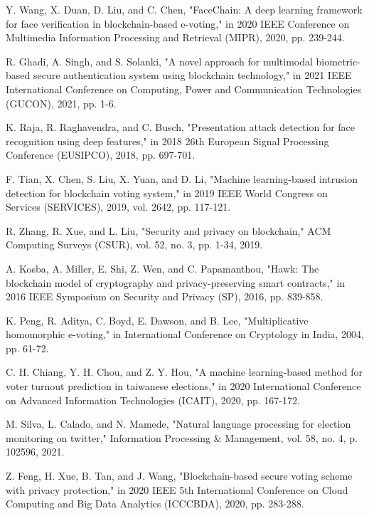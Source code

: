 \documentclass[conference]{IEEEtran}
\begin{document}
\begin{thebibliography}{10}
 Y. Wang, X. Duan, D. Liu, and C. Chen, "FaceChain: A deep learning framework for face verification in blockchain-based e-voting," in 2020 IEEE Conference on Multimedia Information Processing and Retrieval (MIPR), 2020, pp. 239-244.

 R. Ghadi, A. Singh, and S. Solanki, "A novel approach for multimodal biometric-based secure authentication system using blockchain technology," in 2021 IEEE International Conference on Computing, Power and Communication Technologies (GUCON), 2021, pp. 1-6.

 K. Raja, R. Raghavendra, and C. Busch, "Presentation attack detection for face recognition using deep features," in 2018 26th European Signal Processing Conference (EUSIPCO), 2018, pp. 697-701.

 F. Tian, X. Chen, S. Liu, X. Yuan, and D. Li, "Machine learning-based intrusion detection for blockchain voting system," in 2019 IEEE World Congress on Services (SERVICES), 2019, vol. 2642, pp. 117-121.

 R. Zhang, R. Xue, and L. Liu, "Security and privacy on blockchain," ACM Computing Surveys (CSUR), vol. 52, no. 3, pp. 1-34, 2019.

 A. Kosba, A. Miller, E. Shi, Z. Wen, and C. Papamanthou, "Hawk: The blockchain model of cryptography and privacy-preserving smart contracts," in 2016 IEEE Symposium on Security and Privacy (SP), 2016, pp. 839-858.

 K. Peng, R. Aditya, C. Boyd, E. Dawson, and B. Lee, "Multiplicative homomorphic e-voting," in International Conference on Cryptology in India, 2004, pp. 61-72.

 C. H. Chiang, Y. H. Chou, and Z. Y. Hou, "A machine learning-based method for voter turnout prediction in taiwanese elections," in 2020 International Conference on Advanced Information Technologies (ICAIT), 2020, pp. 167-172.

 M. Silva, L. Calado, and N. Mamede, "Natural language processing for election monitoring on twitter," Information Processing & Management, vol. 58, no. 4, p. 102596, 2021.

 Z. Feng, H. Xue, B. Tan, and J. Wang, "Blockchain-based secure voting scheme with privacy protection," in 2020 IEEE 5th International Conference on Cloud Computing and Big Data Analytics (ICCCBDA), 2020, pp. 283-288.

\end{thebibliography}
\end{document}
